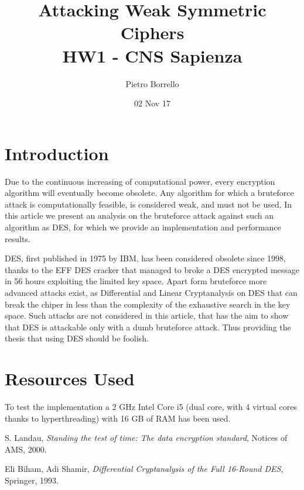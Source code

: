\documentclass[11pt]{article}
\title{Attacking Weak Symmetric Ciphers \\ \bigskip \large HW1 - CNS Sapienza}
\author{Pietro Borrello}
\date{02 Nov 17}
\begin{document}
  \maketitle

  \section{Introduction}
  Due to the continuous increasing of computational power, every encryption algorithm will eventually become obsolete.
  Any algorithm for which a bruteforce attack is computationally feasible, is considered weak, and must not be used. In this article we present an analysis on the bruteforce attack against such an algorithm as DES, for which we provide an implementation and performance results.

  DES, first published in 1975 by IBM, has been considered obsolete since 1998, thanks to the EFF DES cracker \cite{descracker} that managed to broke a DES encrypted message in 56 hours exploiting the limited key space. Apart form bruteforce more advanced attacks exist, as Differential and Linear Cryptanalysis on DES \cite{cryptanalysis} that can break the chiper in less than the complexity of the exhaustive search in the key space. Such attacks are not considered in this article, that has the aim to show that DES is attackable only with a dumb bruteforce attack. Thus providing the thesis that using DES should be foolish.

  \section{Resources Used}
  To test the implementation a 2 GHz Intel Core i5 (dual core, with 4 virtual cores thanks to hyperthreading) with 16 GB of RAM has been used.


  \begin{thebibliography}{99}

      S. Landau,
      \textit{Standing the test of time: The data encryption standard},
      Notices of AMS,
      2000.

      Eli Biham, Adi Shamir,
      \textit{Differential Cryptanalysis of the Full 16-Round DES},
      Springer,
      1993.

  \end{thebibliography}
\end{document}

